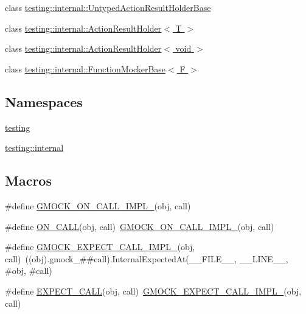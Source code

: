 \begin{DoxyCompactItemize}
\item 
class \hyperlink{classtesting_1_1internal_1_1_untyped_action_result_holder_base}{testing\+::internal\+::\+Untyped\+Action\+Result\+Holder\+Base}
\item 
class \hyperlink{classtesting_1_1internal_1_1_action_result_holder}{testing\+::internal\+::\+Action\+Result\+Holder$<$ T $>$}
\item 
class \hyperlink{classtesting_1_1internal_1_1_action_result_holder_3_01void_01_4}{testing\+::internal\+::\+Action\+Result\+Holder$<$ void $>$}
\item 
class \hyperlink{classtesting_1_1internal_1_1_function_mocker_base}{testing\+::internal\+::\+Function\+Mocker\+Base$<$ F $>$}
\end{DoxyCompactItemize}
\subsection*{Namespaces}
\begin{DoxyCompactItemize}
\item 
 \hyperlink{namespacetesting}{testing}
\item 
 \hyperlink{namespacetesting_1_1internal}{testing\+::internal}
\end{DoxyCompactItemize}
\subsection*{Macros}
\begin{DoxyCompactItemize}
\item 
\#define \hyperlink{gmock-spec-builders_8h_a7c47d936dcf489ac84c046740aea777e}{G\+M\+O\+C\+K\+\_\+\+O\+N\+\_\+\+C\+A\+L\+L\+\_\+\+I\+M\+P\+L\+\_\+}(obj,  call)
\item 
\#define \hyperlink{gmock-spec-builders_8h_a5b12ae6cf84f0a544ca811b380c37334}{O\+N\+\_\+\+C\+A\+LL}(obj,  call)~\hyperlink{gmock-spec-builders_8h_a7c47d936dcf489ac84c046740aea777e}{G\+M\+O\+C\+K\+\_\+\+O\+N\+\_\+\+C\+A\+L\+L\+\_\+\+I\+M\+P\+L\+\_\+}(obj, call)
\item 
\#define \hyperlink{gmock-spec-builders_8h_ae261d723ebfab24d5831030d320f526c}{G\+M\+O\+C\+K\+\_\+\+E\+X\+P\+E\+C\+T\+\_\+\+C\+A\+L\+L\+\_\+\+I\+M\+P\+L\+\_\+}(obj,  call)~((obj).gmock\+\_\+\#\#call).Internal\+Expected\+At(\+\_\+\+\_\+\+F\+I\+L\+E\+\_\+\+\_\+, \+\_\+\+\_\+\+L\+I\+N\+E\+\_\+\+\_\+, \#obj, \#call)
\item 
\#define \hyperlink{gmock-spec-builders_8h_a535a6156de72c1a2e25a127e38ee5232}{E\+X\+P\+E\+C\+T\+\_\+\+C\+A\+LL}(obj,  call)~\hyperlink{gmock-spec-builders_8h_ae261d723ebfab24d5831030d320f526c}{G\+M\+O\+C\+K\+\_\+\+E\+X\+P\+E\+C\+T\+\_\+\+C\+A\+L\+L\+\_\+\+I\+M\+P\+L\+\_\+}(obj, call)
\end{DoxyCompactItemize}
